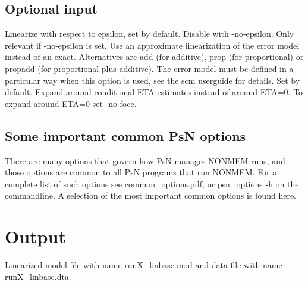 \subsection{Optional input}
\begin{optionlist}
Linearize with respect to epsilon, set by default. Disable with -no-epsilon.
\nextopt
{}
Only relevant if -no-epsilon is set. 
Use an approximate linearization of the error model instead of an exact.
Alternatives are add (for additive), prop (for proportional) or
propadd (for proportional plus additive).
The error model must be defined in a particular way when this option is used,
see the scm userguide for details.
\nextopt
{}
Set by default. Expand around conditional ETA estimates instead of around ETA=0. To expand around ETA=0 set -no-foce.
\nextopt
\end{optionlist}

\subsection{Some important common PsN options}
There are many options that govern how PsN manages NONMEM runs, and
those options are common to all PsN programs that run NONMEM.
For a complete list of such options see common\_options.pdf, 
or psn\_options -h on the commandline. A selection of
the most important common options is found here.



\section{Output}
Linearized model file with name runX\_linbase.mod and data file with name runX\_linbase.dta.



